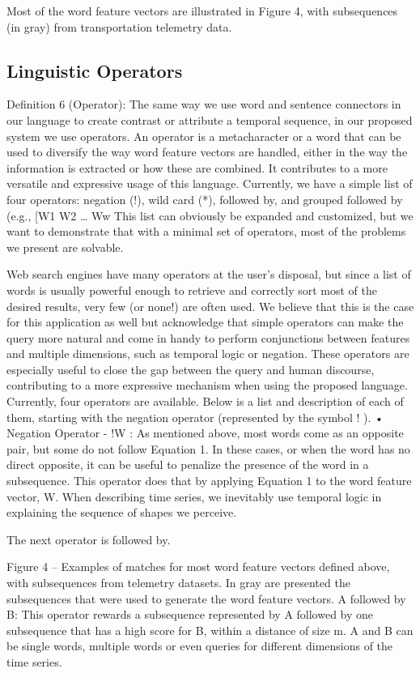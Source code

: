{Most of the word feature vectors are illustrated in Figure 4, with subsequences (in gray) from transportation telemetry data. 



\subsection{Linguistic Operators}

Definition 6 (Operator): The same way we use word and sentence connectors in our language to create contrast or attribute a temporal sequence, in our proposed system we use operators. An operator is a metacharacter or a word that can be used to diversify the way word feature vectors are handled, either in the way the information is extracted or how these are combined.  It contributes to a more versatile and expressive usage of this language. Currently, we have a simple list of four operators: negation (!), wild card (*), followed by, and grouped followed by (e.g., [W1 W2 … Ww This list can obviously be expanded and customized, but we want to demonstrate that with a minimal set of operators, most of the problems we present are solvable. 

Web search engines have many operators at the user’s disposal, but since a list of words is usually powerful enough to retrieve and correctly sort most of the desired results, very few (or none!) are often used. We believe that this is the case for this application as well but acknowledge that simple operators can make the query more natural and come in handy to perform conjunctions between features and multiple dimensions, such as temporal logic or negation. These operators are especially useful to close the gap between the query and human discourse, contributing to a more expressive mechanism when using the proposed language. Currently, four operators are available. Below is a list and description of each of them, starting with the negation operator (represented by the symbol  ! ).
•	Negation Operator  - !W : As mentioned above, most words come as an opposite pair, but some do not follow Equation 1. In these cases, or when the word has no direct opposite, it can be useful to penalize the presence of the word in a subsequence. This operator does that by applying Equation 1 to the word feature vector, W. 
When describing time series, we inevitably use temporal logic in explaining the sequence of shapes we perceive. 

The next operator is followed by.
 

Figure 4 – Examples of matches for most word feature vectors defined above, with subsequences from telemetry datasets. In gray are presented the subsequences that were used to generate the word feature vectors.
	A followed by B: This operator rewards a subsequence represented by A followed by one subsequence that has a high score for B, within a distance of size m. A and B can be single words, multiple words or even queries for different dimensions of the time series.

}
